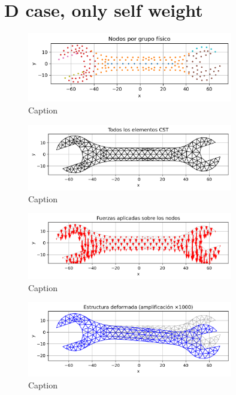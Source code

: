 \documentclass{article}  %
\begin{document}
\section{D case, only self weight}

\begin{figure}
  \centering
  \includegraphics[width=0.8\textwidth]{GRAFICOS/Case d_nodes_por_grupo.png}
  \caption{Caption}
  \label{fig:wrench}
\end{figure}

\begin{figure}
  \centering
  \includegraphics[width=0.8\textwidth]{GRAFICOS/Case d_elementos.png}
  \caption{Caption}
  \label{fig:deformed_shape}
\end{figure}

\begin{figure}
  \centering
  \includegraphics[width=0.8\textwidth]{GRAFICOS/Case d_fuerzas.png}
  \caption{Caption}
  \label{fig:strain}
\end{figure}

\begin{figure}
  \centering
  \includegraphics[width=0.8\textwidth]{GRAFICOS/Case d_deformada.png}
  \caption{Caption}
  \label{fig:stress}
\end{figure}
\end{document}
